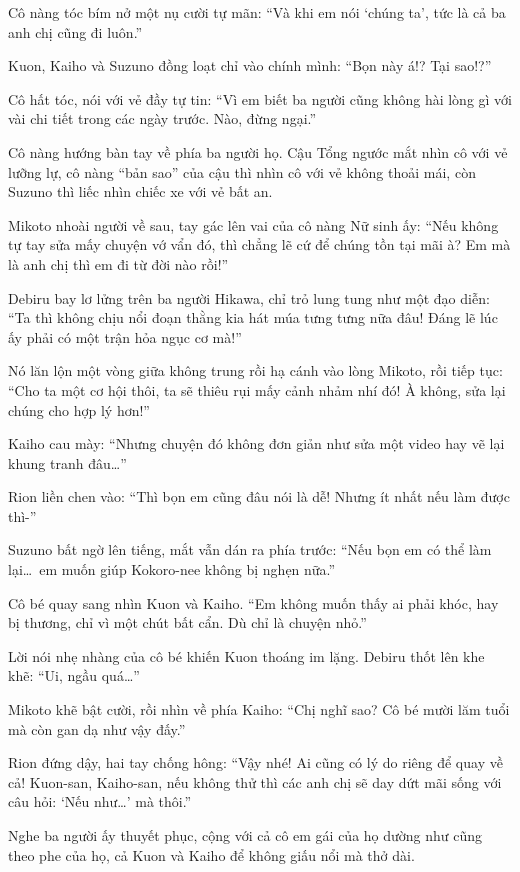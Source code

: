 \documentclass[../main.tex]{subfiles}
\begin{document}
Cô nàng tóc bím nở một nụ cười tự mãn: ``Và khi em nói `chúng ta', tức là cả ba anh chị cũng đi luôn.''

Kuon, Kaiho và Suzuno đồng loạt chỉ vào chính mình: ``Bọn này á!? Tại sao!?''

Cô hất tóc, nói với vẻ đầy tự tin: ``Vì em biết ba người cũng không hài lòng gì với vài chi tiết trong các ngày trước. Nào, đừng ngại.''

Cô nàng hướng bàn tay về phía ba người họ. Cậu Tổng ngước mắt nhìn cô với vẻ lưỡng lự, cô nàng ``bản sao'' của cậu thì nhìn cô với vẻ không thoải mái, còn Suzuno thì liếc nhìn chiếc xe với vẻ bất an.

Mikoto nhoài người về sau, tay gác lên vai của cô nàng Nữ sinh ấy: ``Nếu không tự tay sửa mấy chuyện vớ vẩn đó, thì chẳng lẽ cứ để chúng tồn tại mãi à? Em mà là anh chị thì em đi từ đời nào rồi!''

Debiru bay lơ lửng trên ba người Hikawa, chỉ trỏ lung tung như một đạo diễn: ``Ta thì không chịu nổi đoạn thằng kia hát múa tưng tưng nữa đâu! Đáng lẽ lúc ấy phải có một trận hỏa ngục cơ mà!''

Nó lăn lộn một vòng giữa không trung rồi hạ cánh vào lòng Mikoto, rồi tiếp tục: ``Cho ta một cơ hội thôi, ta sẽ thiêu rụi mấy cảnh nhảm nhí đó! À không, sửa lại chúng cho hợp lý hơn!''

Kaiho cau mày: ``Nhưng chuyện đó không đơn giản như sửa một video hay vẽ lại khung tranh đâu\dots''

Rion liền chen vào: ``Thì bọn em cũng đâu nói là dễ! Nhưng ít nhất nếu làm được thì-''

Suzuno bất ngờ lên tiếng, mắt vẫn dán ra phía trước: ``Nếu bọn em có thể làm lại\dots\ em muốn giúp Kokoro-nee không bị nghẹn nữa.''

Cô bé quay sang nhìn Kuon và Kaiho. ``Em không muốn thấy ai phải khóc, hay bị thương, chỉ vì một chút bất cẩn. Dù chỉ là chuyện nhỏ.''

Lời nói nhẹ nhàng của cô bé khiến Kuon thoáng im lặng.
Debiru thốt lên khe khẽ: ``Ui, ngầu quá\dots''

Mikoto khẽ bật cười, rồi nhìn về phía Kaiho: ``Chị nghĩ sao? Cô bé mười lăm tuổi mà còn gan dạ như vậy đấy.''

Rion đứng dậy, hai tay chống hông: ``Vậy nhé! Ai cũng có lý do riêng để quay về cả! Kuon-san, Kaiho-san, nếu không thử thì các anh chị sẽ day dứt mãi sống với câu hỏi: `Nếu như\dots' mà thôi.''

Nghe ba người ấy thuyết phục, cộng với cả cô em gái của họ dường như cũng theo phe của họ, cả Kuon và Kaiho để không giấu nổi mà thở dài.
\end{document}
